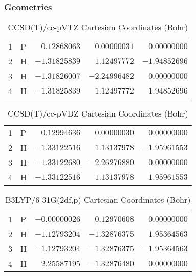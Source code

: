 \documentclass[10pt,oneside]{article}
\begin{document}
\subsubsection*{Geometries}
\begin{table}[h!]
\centering
\caption{CCSD(T)/cc-pVTZ Cartesian Coordinates (Bohr)}
\begin{tabular}{llrrr}
1  & P  & $ 0.12868063$ & $ 0.00000031$ & $ 0.00000000$ \\
2  & H  & $-1.31825839$ & $ 1.12497772$ & $-1.94852696$ \\
3  & H  & $-1.31826007$ & $-2.24996482$ & $ 0.00000000$ \\
4  & H  & $-1.31825839$ & $ 1.12497772$ & $ 1.94852696$ \\
\end{tabular}
\end{table}

\begin{table}[h!]
\centering
\caption{CCSD(T)/cc-pVDZ Cartesian Coordinates (Bohr)}
\begin{tabular}{llrrr}
1  & P  & $ 0.12994636$ & $ 0.00000030$ & $ 0.00000000$ \\
2  & H  & $-1.33122516$ & $ 1.13137978$ & $-1.95961553$ \\
3  & H  & $-1.33122680$ & $-2.26276880$ & $ 0.00000000$ \\
4  & H  & $-1.33122516$ & $ 1.13137978$ & $ 1.95961553$ \\
\end{tabular}
\end{table}

\begin{table}[h!]
\centering
\caption{B3LYP/6-31G(2df,p) Cartesian Coordinates (Bohr)}
\begin{tabular}{llrrr}
1  & P  & $-0.00000026$ & $ 0.12970608$ & $ 0.00000000$ \\
2  & H  & $-1.12793204$ & $-1.32876375$ & $ 1.95364563$ \\
3  & H  & $-1.12793204$ & $-1.32876375$ & $-1.95364563$ \\
4  & H  & $ 2.25587195$ & $-1.32876480$ & $ 0.00000000$ \\
\end{tabular}
\end{table}

\clearpage
\end{document}
